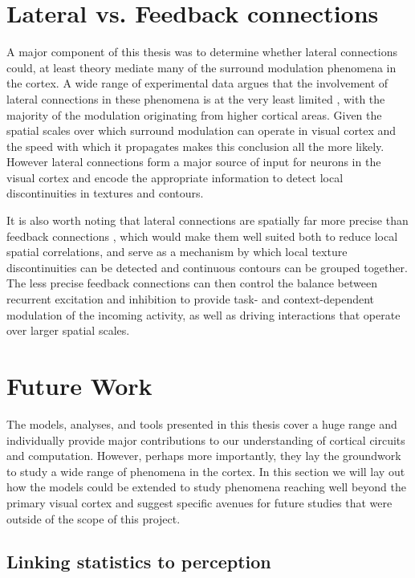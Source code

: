 \section{Lateral vs. Feedback connections}

A major component of this thesis was to determine whether lateral
connections could, at least theory mediate many of the surround
modulation phenomena in the cortex. A wide range of experimental data
argues that the involvement of lateral connections in these phenomena
is at the very least limited \citep{Levitt2002, Bair2003,
  Schwabe2006}, with the majority of the modulation originating from
higher cortical areas. Given the spatial scales over which surround
modulation can operate in visual cortex and the speed with which it
propagates makes this conclusion all the more likely. However lateral
connections form a major source of input for neurons in the visual
cortex and encode the appropriate information to detect local
discontinuities in textures and contours.

It is also worth noting that lateral connections are spatially far
more precise than feedback connections \citep{Angelucci2006}, which
would make them well suited both to reduce local spatial correlations,
and serve as a mechanism by which local texture discontinuities can be
detected and continuous contours can be grouped together. The less
precise feedback connections can then control the balance between
recurrent excitation and inhibition to provide task- and
context-dependent modulation of the incoming activity, as well as
driving interactions that operate over larger spatial scales.

\section{Future Work}

The models, analyses, and tools presented in this thesis cover a huge
range and individually provide major contributions to our
understanding of cortical circuits and computation. However, perhaps
more importantly, they lay the groundwork to study a wide range of
phenomena in the cortex. In this section we will lay out how the
models could be extended to study phenomena reaching well beyond the
primary visual cortex and suggest specific avenues for future studies
that were outside of the scope of this project.

\subsection{Linking statistics to perception}

